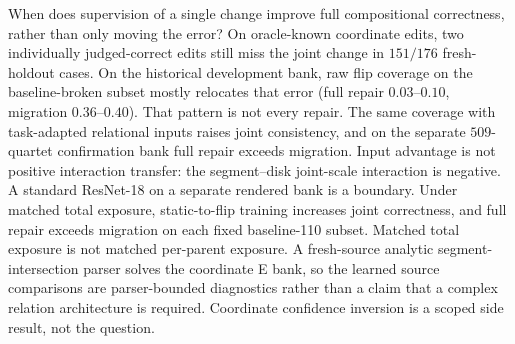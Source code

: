 When does supervision of a single change improve full compositional
correctness, rather than only moving the error? On oracle-known coordinate
edits, two individually judged-correct edits still miss the joint change
in $151/176$ fresh-holdout cases. On the historical development bank, raw
flip coverage on the baseline-broken subset mostly relocates that error
(full repair $0.03$--$0.10$, migration $0.36$--$0.40$). That pattern is
not every repair. The same coverage with task-adapted relational inputs
raises joint consistency, and on the separate $509$-quartet confirmation
bank full repair exceeds migration. Input advantage is not positive
interaction transfer: the segment--disk joint-scale interaction is
negative. A standard ResNet-18 on a separate rendered bank is a boundary.
Under matched total exposure, static-to-flip training increases joint
correctness, and full repair exceeds migration on each fixed baseline-110
subset. Matched total exposure is not matched per-parent exposure.
A fresh-source analytic segment-intersection parser solves the coordinate
E bank, so the learned source comparisons are parser-bounded diagnostics
rather than a claim that a complex relation architecture is required.
Coordinate confidence inversion is a scoped side result, not the question.
